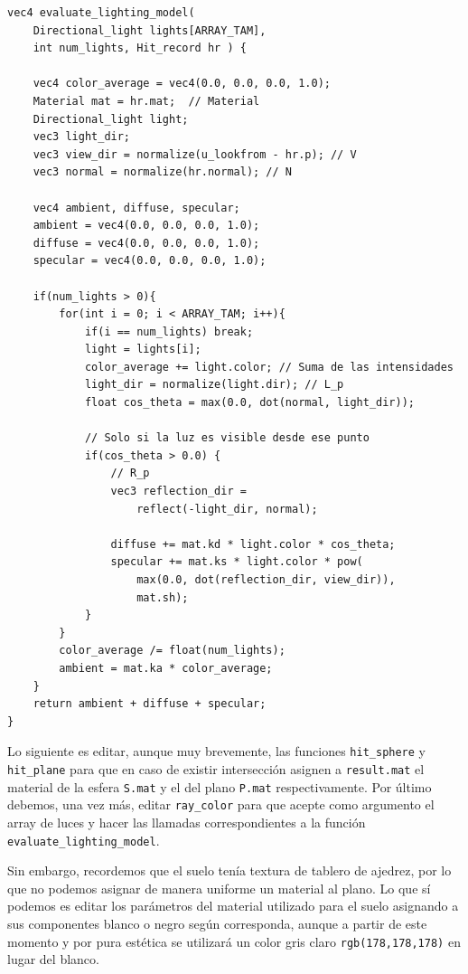 \begin{lstlisting}
vec4 evaluate_lighting_model( 
    Directional_light lights[ARRAY_TAM], 
    int num_lights, Hit_record hr ) {

    vec4 color_average = vec4(0.0, 0.0, 0.0, 1.0);
    Material mat = hr.mat;  // Material
    Directional_light light;
    vec3 light_dir;
    vec3 view_dir = normalize(u_lookfrom - hr.p); // V
    vec3 normal = normalize(hr.normal); // N

    vec4 ambient, diffuse, specular;
    ambient = vec4(0.0, 0.0, 0.0, 1.0);
    diffuse = vec4(0.0, 0.0, 0.0, 1.0);
    specular = vec4(0.0, 0.0, 0.0, 1.0);

    if(num_lights > 0){
        for(int i = 0; i < ARRAY_TAM; i++){
            if(i == num_lights) break;
            light = lights[i];
            color_average += light.color; // Suma de las intensidades
            light_dir = normalize(light.dir); // L_p
            float cos_theta = max(0.0, dot(normal, light_dir));
            
            // Solo si la luz es visible desde ese punto
            if(cos_theta > 0.0) {
                // R_p
                vec3 reflection_dir = 
                    reflect(-light_dir, normal);

                diffuse += mat.kd * light.color * cos_theta;
                specular += mat.ks * light.color * pow( 
                    max(0.0, dot(reflection_dir, view_dir)), 
                    mat.sh);
            }
        }
        color_average /= float(num_lights);
        ambient = mat.ka * color_average;
    }
    return ambient + diffuse + specular;
}
\end{lstlisting}

Lo siguiente es editar, aunque muy brevemente, las funciones \verb|hit_sphere| y \verb|hit_plane| para que en caso de existir intersección asignen a \verb|result.mat| el material de la esfera \verb|S.mat| y el del plano \verb|P.mat| respectivamente. Por último debemos, una vez más, editar \verb|ray_color| para que acepte como argumento el array de luces y hacer las llamadas correspondientes a la función \verb|evaluate_lighting_model|.

Sin embargo, recordemos que el suelo tenía textura de tablero de ajedrez, por lo que no podemos asignar de manera uniforme un material al plano. Lo que sí podemos es editar los parámetros del material utilizado para el suelo asignando a sus componentes blanco o negro según corresponda, aunque a partir de este momento y por pura estética se utilizará un color gris claro \verb|rgb(178,178,178)| en lugar del blanco.

